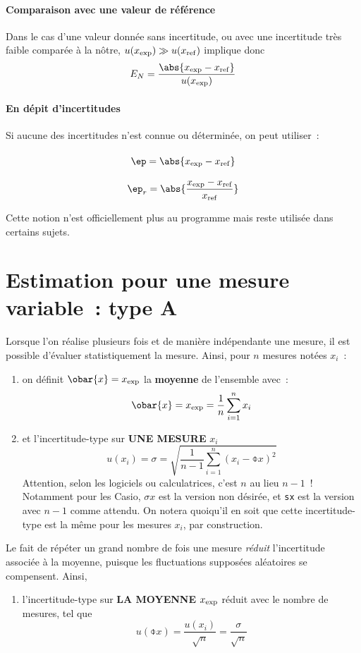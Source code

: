\documentclass[../main/main.tex]{subfiles}
\begin{document}
\paragraph*{Comparaison avec une valeur de référence}
Dans le cas d'une valeur donnée sans incertitude, ou avec une incertitude
très faible comparée à la nôtre, $u(x_{\rm exp}) \gg u(x_{\rm ref})$ implique
donc
\[
	E_N = \frac{\abs{x_{\rm exp} - x_{\rm ref}}}{u(x_{\rm exp})}
\]

\paragraph*{En dépit d'incertitudes}
Si aucune des incertitudes n'est connue ou déterminée, on peut utiliser~:
\begin{tcolorbox}[blankest]
	\begin{isd}
		\[
			\ep = \abs{x_{\rm exp} - x_{\rm ref}}
			\vphantom{\abs{\frac{x_{\rm exp} - x_{\rm ref}}{x_{\rm ref}}}}
		\]
		\tcblower
		\[
			\ep_r = \abs{\frac{x_{\rm exp} - x_{\rm ref}}{x_{\rm ref}}}
		\]
	\end{isd}
\end{tcolorbox}

Cette notion n'est officiellement plus au programme mais reste utilisée dans
certains sujets.

\section{Estimation pour une mesure variable~: type A}

Lorsque l'on réalise plusieurs fois et de manière indépendante une mesure, il
est possible d'évaluer statistiquement la mesure. Ainsi, pour $n$ mesures notées
$x_i$~:
\begin{enumerate}
	\item on définit $\obar{x} = x_{\rm exp}$ la \textbf{moyenne} de
	      l'ensemble avec~:
	      \[
		      \obar{x} = x_{\rm exp} = \frac{1}{n} \sum_{i=1}^{n} x_i
	      \]
	\item et l'incertitude-type sur \textbf{UNE MESURE} $x_i$
	      \[
		      u(x_i) = \sigma =
		      \sqrt{\frac{1}{n-1} \sum_{i=1}^{n} (x_i - \obar{x})^{2}}
	      \]
	      Attention, selon les logiciels ou calculatrices, c'est $n$ au lieu $n-1$~!
	      Notamment pour les Casio, \texttt{$\sigma x$} est la version non désirée, et
	      \texttt{sx} est la version avec $n-1$ comme attendu. On notera quoiqu'il en soit
	      que cette incertitude-type est la même pour  les mesures $x_i$, par
	      construction.
\end{enumerate}
Le fait de répéter un grand nombre de fois une mesure \textit{réduit}
l'incertitude associée à la moyenne, puisque les fluctuations supposées
aléatoires se compensent. Ainsi,
\begin{enumerate}[resume]
	\item l'incertitude-type sur \textbf{LA MOYENNE} $x_{\rm exp}$ réduit avec le
	      nombre de mesures, tel que
	      \[
		      u(\obar{x}) = \frac{u(x_i)}{\sqrt{n}} = \frac{\sigma}{\sqrt{n}}
	      \]
\end{enumerate}
\end{document}
